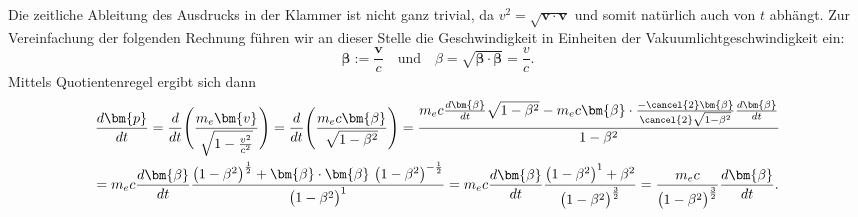 Die zeitliche Ableitung des Ausdrucks in der Klammer ist nicht ganz trivial,
da \(v^2=\sqrt{\bm{v}\cdot\bm{v}}\)
und somit natürlich auch von \(t\) abhängt.
Zur Vereinfachung der folgenden Rechnung führen wir an dieser Stelle
die Geschwindigkeit in Einheiten der Vakuumlichtgeschwindigkeit ein:
\begin{equation*}
    \bm{\beta} := \frac{\bm{v}}{c} \quad \text{und} \quad
    \beta = \sqrt{\bm{\beta}\cdot\bm{\beta}} = \frac{v}{c}.
\end{equation*}
Mittels Quotientenregel ergibt sich dann
\begin{multline*}
    \frac{d\bm{p}}{dt}
    = \frac{d}{dt} \Biggl(\frac{m_e \bm{v}}{\sqrt{1-\frac{v^2}{c^2}}}\Biggr)
    = \frac{d}{dt} \Biggl(\frac{m_e c \bm{\beta}}{\sqrt{1-\beta^2}}\Biggr)
    = \frac{m_ec\frac{d\bm{\beta}}{dt}\sqrt{1-\beta^2}
    -m_ec\bm{\beta}\cdot\frac{-\cancel{2}\bm{\beta}}{\cancel{2}\sqrt{1-\beta^2}}
    \frac{d\bm{\beta}}{dt}}{1-\beta^2}\\
    = m_ec\frac{d\bm{\beta}}{dt}\frac{\bigl(1-\beta^2\bigr)^\frac{1}{2}
    +\bm{\beta}\cdot\bm{\beta} \ \bigl(1-\beta^2\bigr)^{-\frac{1}{2}}}
    {\bigl(1-\beta^2\bigr)^1}
    = m_ec\frac{d\bm{\beta}}{dt}\frac{\bigl(1-\beta^2\bigr)^1
    +\beta^2}{\bigl(1-\beta^2\bigr)^\frac{3}{2}}
    = \frac{m_ec}{\bigl(1-\beta^2\bigr)^\frac{3}{2}}\frac{d\bm{\beta}}{dt}.
\end{multline*}

